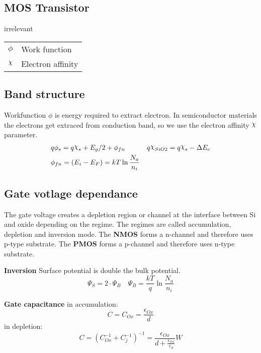 \documentclass[a4paper, fontsize=8pt, landscape, DIV=1]{scrartcl}
\newcommand{\makeultracompact}{irrelevant}
\begin{document}
\begin{multicols*}{4}
    \section{MOS Transistor}
    \ifdefined\makeultracompact
    \else
      \begin{tabular}[h]{l l}
        $\phi$   & Work function \\
        $\altchi$    & Electron affinity \\
      \end{tabular}
    \fi

    \subsection{Band structure}
    Workfunction $\phi$ is energy required to extract electron. 
    In semiconductor materials the electrons get extraced from conduction band, so we use
    the electron affinity $\altchi$ parameter.
    \begin{align*}
      &q\phi_s = q\altchi_s + E_g/2 + \phi_{fn} & q\altchi_{SiO2} = q\altchi_s - \Delta E_c \\
      &\phi_{fn} = (E_i - E_F) = kT\ln\frac{N_a}{n_i}
    \end{align*}

    \subsection{Gate votlage dependance}
    The gate voltage creates a depletion region or channel at the interface between Si and oxide depending on the regime.
    The regimes are called  accumulation,  depletion and  inversion mode.
    The \textbf{NMOS} forms a n-channel and therefore uses p-type substrate.
    The \textbf{PMOS} forms a p-channel and therefore uses n-type substrate.

    \textbf{Inversion} 
    Surface potential is double the bulk potential.
    \[\Psi_S = 2\cdot\Psi_B \quad \Psi_B = \frac{kT}{q}\ln\frac{N_a}{n_i}\]

    \textbf{Gate capacitance} 
    in accumulation:
    \[C = C_{Ox} = \frac{\epsilon_{Ox}}{d} \]
    in depletion:
    \[C = (C_{Ox}^{-1}+C_{j}^{-1})^{-1} = \frac{\epsilon_{Ox}}{d + \frac{\epsilon_{Ox}}{\epsilon_S}}W \]


\end{multicols*}
\end{document}
